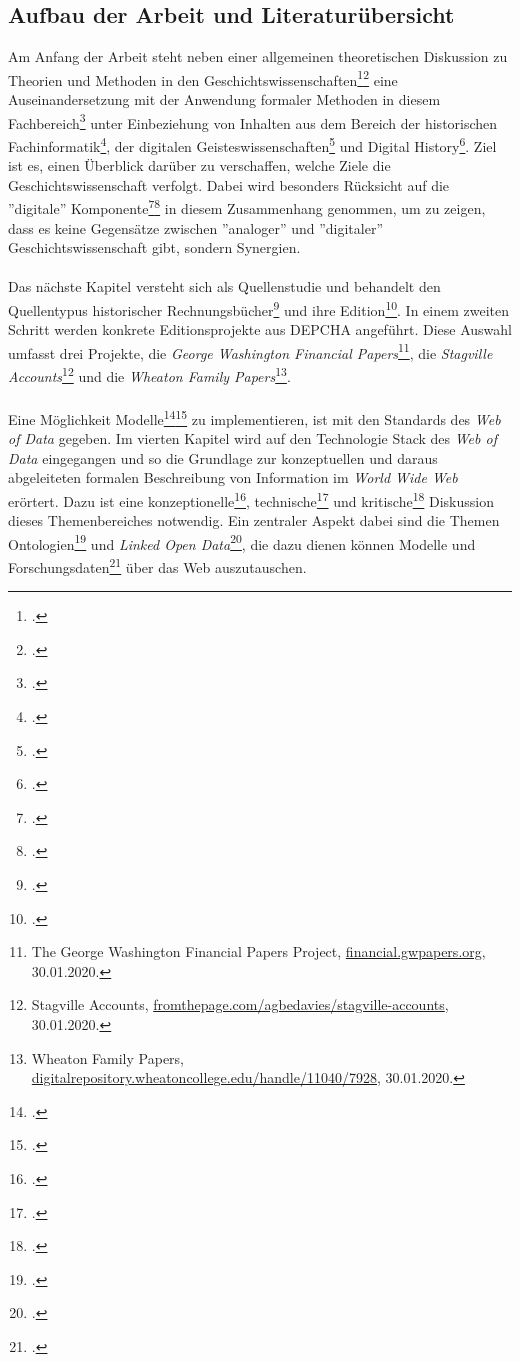\documentclass[12pt,a4paper]{article}
\begin{document}
\subsection{Aufbau der Arbeit und Literaturübersicht}
Am Anfang der Arbeit steht neben einer allgemeinen theoretischen Diskussion zu Theorien und Methoden in den Geschichtswissenschaften\footcite{jordan2018theorien}\footcite{hardtwig1990geschichtskultur} eine Auseinandersetzung mit der Anwendung formaler Methoden in diesem Fachbereich\footcite{thaller2017ungefahre} unter Einbeziehung von Inhalten aus dem Bereich der historischen Fachinformatik\footcite{thaller2017historical}, der digitalen Geisteswissenschaften\footcite{jannidis2017digital} und Digital History\footcite{graham2015exploring}. Ziel ist es, einen Überblick darüber zu verschaffen, welche Ziele die Geschichtswissenschaft verfolgt. Dabei wird besonders Rücksicht auf die ''digitale'' Komponente\footcite{fohr2017historische}\footcite{wintergrun2019netzwerkanalysen} in diesem Zusammenhang genommen, um zu zeigen, dass es keine Gegensätze zwischen ''analoger'' und ''digitaler'' Geschichtswissenschaft gibt, sondern Synergien.
\\
\\
Das nächste Kapitel versteht sich als Quellenstudie und behandelt den Quellentypus historischer Rechnungsbücher\footcite{gleba2015wirtschafts} und ihre Edition\footcite{vogeler2015mittelalterliche}. In einem zweiten Schritt werden konkrete Editionsprojekte aus DEPCHA angeführt. Diese Auswahl umfasst drei Projekte, die \textit{George Washington Financial Papers}\footnote{The George Washington Financial Papers Project, \url{financial.gwpapers.org}, 30.01.2020.}, die \textit{Stagville Accounts}\footnote{Stagville Accounts, \url{fromthepage.com/agbedavies/stagville-accounts}, 30.01.2020.}  und die \textit{Wheaton Family Papers}\footnote{Wheaton Family Papers, \url{digitalrepository.wheatoncollege.edu/handle/11040/7928}, 30.01.2020.}.
\\
\\
Eine Möglichkeit Modelle\footcite[][]{stachowiak1973allgemeine}\footcite{mccarty2004modeling} zu implementieren, ist mit den Standards des \textit{Web of Data} gegeben. Im vierten Kapitel wird auf den Technologie Stack des \textit{Web of Data} eingegangen und so die Grundlage zur konzeptuellen und daraus abgeleiteten formalen Beschreibung von Information im \textit{World Wide Web} erörtert. Dazu ist eine konzeptionelle\footcite{berners2001semantic}, technische\footcite{bernstein2016new} und kritische\footcite{swartz2013aaron} Diskussion dieses Themenbereiches notwendig. Ein zentraler Aspekt dabei sind die Themen Ontologien\footcite{stuckenschmidt2009ontologien} und \textit{Linked Open Data}\footcite{bauer2011linked}, die dazu dienen können Modelle und Forschungsdaten\footcite{neher2011semantische} über das Web auszutauschen.
\end{document}

